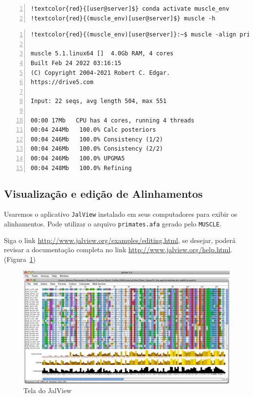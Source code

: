 \documentclass[letter,11pt]{book}
\begin{document}
\begin{Verbatim}[commandchars=!\{\},numbers=left,label=MUSCLE,frame=topline,fontsize=\scriptsize]
!textcolor{red}{[user@server]$} conda activate muscle_env
!textcolor{red}{(muscle_env)[user@server]$} muscle -h
\end{Verbatim} 

\begin{Verbatim}[commandchars=!\{\},numbers=left,label=MUSCLE,frame=topline,fontsize=\scriptsize]
!textcolor{red}{(muscle_env)[user@server]}:~$ muscle -align primatesAA.fasta -output primates.afa

muscle 5.1.linux64 []  4.0Gb RAM, 4 cores
Built Feb 24 2022 03:16:15
(C) Copyright 2004-2021 Robert C. Edgar.
https://drive5.com

Input: 22 seqs, avg length 504, max 551

00:00 17Mb   CPU has 4 cores, running 4 threads
00:04 244Mb   100.0% Calc posteriors
00:04 246Mb   100.0% Consistency (1/2)
00:04 246Mb   100.0% Consistency (2/2)
00:04 246Mb   100.0% UPGMA5           
00:04 248Mb   100.0% Refining
\end{Verbatim} 


\subsection{Visualização e edição de Alinhamentos}

Usaremos o aplicativo \Verb+JalView+ instalado em seus computadores para exibir os alinhamentos. Pode utilizar o arquivo \Verb+primates.afa+ gerado pelo \Verb+MUSCLE+.

Siga o link \url{http://www.jalview.org/examples/editing.html}, se desejar, poderá revisar a documentação completa no link \url{http://www.jalview.org/help.html}.(Figura~\ref{fig:JalView})

\begin{figure}[h!]
\centering
 \includegraphics[width=15cm]{Figs/JalView.png}
 \caption{\label{fig:JalView}Tela do JalView}
\end{figure}
\end{document}
